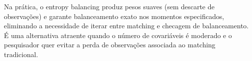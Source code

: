 \documentclass[
]{article}
\newenvironment{Shaded}{\begin{snugshade}}{\end{snugshade}}
\newcommand{\AttributeTok}[1]{\textcolor[rgb]{0.13,0.29,0.53}{#1}}
\newcommand{\CommentTok}[1]{\textcolor[rgb]{0.56,0.35,0.01}{\textit{#1}}}
\newcommand{\DecValTok}[1]{\textcolor[rgb]{0.00,0.00,0.81}{#1}}
\newcommand{\FunctionTok}[1]{\textcolor[rgb]{0.13,0.29,0.53}{\textbf{#1}}}
\newcommand{\NormalTok}[1]{#1}
\newcommand{\OtherTok}[1]{\textcolor[rgb]{0.56,0.35,0.01}{#1}}
\newcommand{\SpecialCharTok}[1]{\textcolor[rgb]{0.81,0.36,0.00}{\textbf{#1}}}
\newcommand{\StringTok}[1]{\textcolor[rgb]{0.31,0.60,0.02}{#1}}
\begin{document}
Na prática, o entropy balancing produz pesos suaves (sem descarte de observações) e garante balanceamento exato nos momentos especificados, eliminando a necessidade de iterar entre matching e checagem de balanceamento. É uma alternativa atraente quando o número de covariáveis é moderado e o pesquisador quer evitar a perda de observações associada ao matching tradicional.

\begin{Shaded}
\end{Shaded}
\end{document}
